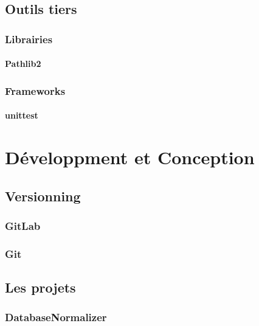 \documentclass{article}
\begin{document}
\subsection{Outils tiers}

\subsubsection{Librairies}

\paragraph{Pathlib2}

\subsubsection{Frameworks}

\paragraph{unittest}

\newpage


\section{Développment et Conception}

\subsection{Versionning}

\subsubsection{GitLab}

\subsubsection{Git}

\subsection{Les projets}

\subsubsection{DatabaseNormalizer}
\end{document}
